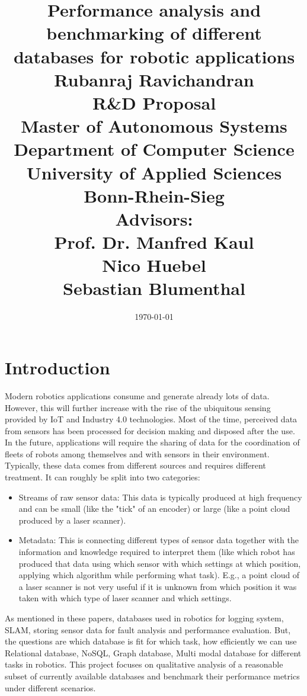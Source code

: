 \documentclass[12pt]{article}
\begin{document}
\title{\Large Performance analysis and benchmarking of different databases for robotic applications\\
[6mm]
\Large Rubanraj Ravichandran\\
[12mm]
\Large R\&D Proposal\\
\small Master of Autonomous Systems\\
[12mm]
\Large Department of Computer Science\\
University of Applied Sciences Bonn-Rhein-Sieg\\
[12mm]
\Large Advisors:\\
Prof. Dr. Manfred Kaul\\
Nico Huebel\\
Sebastian Blumenthal
}
\date{\today}
\maketitle
\newpage
\section{Introduction}

Modern robotics applications consume and generate already lots of data. However, this will further increase with the rise of the ubiquitous sensing provided by IoT and Industry 4.0 technologies. Most of the time, perceived data from sensors has been processed for decision making and disposed after the use.
In the future, applications will require the sharing of data for the coordination of fleets of robots among themselves and with sensors in their environment. Typically, these data comes from different sources and requires different treatment. It can roughly be split into two categories:
\begin{itemize}
\item Streams of raw sensor data: This data is typically produced at high frequency and can be small (like the "tick" of an encoder) or large (like a point cloud produced by a laser scanner).
\item Metadata: This is connecting different types of sensor data together with the information and knowledge required to interpret them (like which robot has produced that data using which sensor with which settings at which position, applying which algorithm while performing what task). E.g., a point cloud of a laser scanner is not very useful if it is unknown from which position it was taken with which type of laser scanner and which settings.
\end{itemize}
As mentioned in these papers\cite{reference1}\cite{reference2}\cite{reference3}\cite{reference4}, databases used in robotics for logging system, SLAM, storing sensor data for fault analysis and performance evaluation. But, the questions are which database is fit for which task, how efficiently we can use Relational database, NoSQL\cite{reference5}, Graph database\cite{reference6}, Multi modal database for different tasks in robotics. This project focuses on qualitative analysis of a reasonable subset of currently available databases and benchmark their performance metrics under different scenarios.
\end{document}
